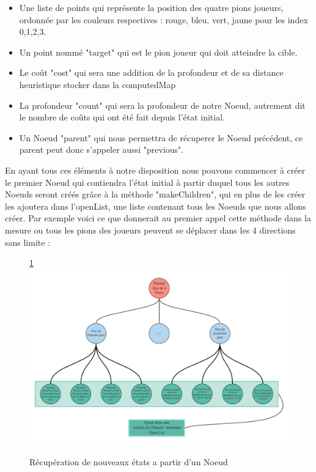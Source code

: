 \documentclass{rapportECL}
\begin{document}
\begin{itemize}
    \item Une liste de points qui représente la position des quatre pions joueurs, ordonnée par les couleurs respectives : rouge, bleu, vert, jaune pour les index 0,1,2,3.
    \item Un point nommé "target" qui est le pion joueur qui doit atteindre la cible.
    \item \label{calcule} Le coût "cost" qui sera une addition de la profondeur et de sa distance heuristique stocker dans la computedMap
    \item La profondeur "count" qui sera la profondeur de notre Noeud, autrement dit le nombre de coûts qui ont été fait depuis l'état initial.
    \item Un Noeud "parent" qui nous permettra de récuperer le Noeud précédent, ce parent peut donc s'appeler aussi "previous".
\end{itemize}

En ayant tous ces éléments à notre disposition nous pouvons commencer à créer le premier Noeud qui contiendra l'état initial à partir duquel tous les autres Noeuds seront créés grâce à la méthode "makeChildren", qui en plus de les créer les ajoutera dans l'openList, une liste contenant tous les Noeuds que nous allons créer. Par exemple voici ce que donnerait au premier appel cette méthode dans la mesure ou tous les pions des joueurs peuvent se déplacer dans les 4 directions sans limite : 

 \begin{figure}[h]
    \centering
    \ref{Fig7}
    \includegraphics[width=1\textwidth]{Graphique/MakeChildrens.png}
    \caption{Récupération de nouveaux états a partir d'un Noeud}
    \label{Fig7}
\end{figure}
\end{document}
